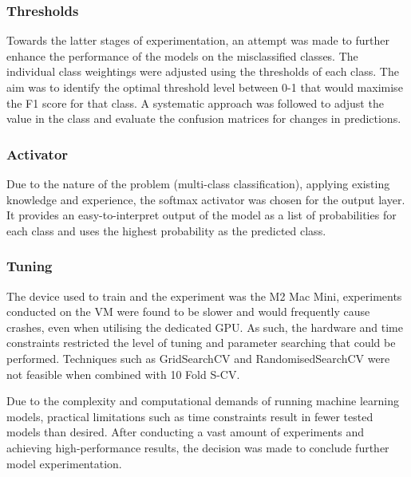  
\subsubsection*{Thresholds}
Towards the latter stages of experimentation, an attempt was made to further enhance the performance of the models on the misclassified classes. The individual class weightings were adjusted using the thresholds of each class. The aim was to identify the optimal threshold level between 0-1 that would maximise the F1 score for that class. A systematic approach was followed to adjust the value in the class and evaluate the confusion matrices for changes in predictions.
 
 
\subsubsection*{Activator}
Due to the nature of the problem (multi-class classification), applying existing knowledge and experience, the softmax activator was chosen for the output layer. It provides an easy-to-interpret output of the model as a list of probabilities for each class and uses the highest probability as the predicted class.

\subsubsection*{Tuning}

The device used to train and the experiment was the M2 Mac Mini, experiments conducted on the VM were found to be slower and would frequently cause crashes, even when utilising the dedicated GPU. As such, the hardware and time constraints restricted the level of tuning and parameter searching that could be performed. Techniques such as GridSearchCV and RandomisedSearchCV were not feasible when combined with 10 Fold S-CV. 

\medskip
Due to the complexity and computational demands of running machine learning models, practical limitations such as time constraints result in fewer tested models than desired. After conducting a vast amount of experiments and achieving high-performance results, the decision was made to conclude further model experimentation. 
 
